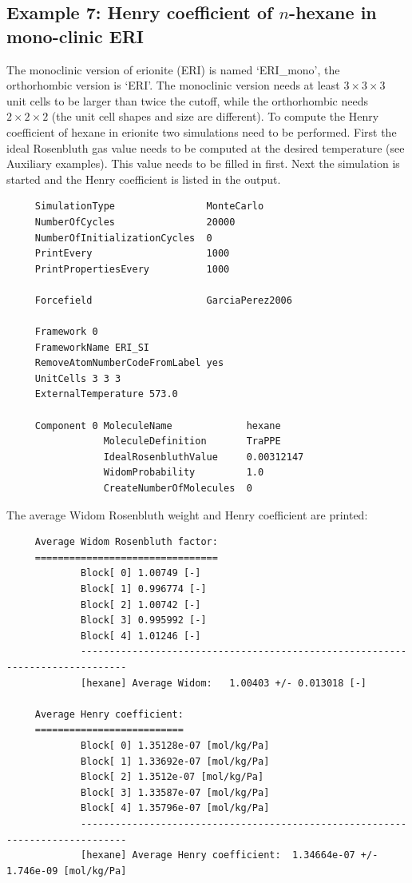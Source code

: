 \subsection*{Example 7: Henry coefficient of $n$-hexane in mono-clinic ERI}
The monoclinic version of erionite (ERI) is named `ERI\_mono', the orthorhombic version is `ERI'.
The monoclinic version needs at least $3\times3\times3$ unit cells to be larger than twice the cutoff,
while the orthorhombic needs $2\times2\times2$ (the unit cell shapes and size are different).
To compute the Henry coefficient of hexane in erionite two simulations need to be performed. First
the ideal Rosenbluth gas value needs to be computed at the desired temperature (see Auxiliary examples).
This value needs to be filled in first. Next the simulation is started and the Henry coefficient is
listed in the output.
\begin{tiny}
\begin{verbatim}
     SimulationType                MonteCarlo
     NumberOfCycles                20000
     NumberOfInitializationCycles  0
     PrintEvery                    1000
     PrintPropertiesEvery          1000
     
     Forcefield                    GarciaPerez2006
     
     Framework 0
     FrameworkName ERI_SI
     RemoveAtomNumberCodeFromLabel yes
     UnitCells 3 3 3
     ExternalTemperature 573.0
     
     Component 0 MoleculeName             hexane
                 MoleculeDefinition       TraPPE
                 IdealRosenbluthValue     0.00312147
                 WidomProbability         1.0
                 CreateNumberOfMolecules  0
\end{verbatim}
\end{tiny}

The average Widom Rosenbluth weight and Henry coefficient are printed:
\begin{tiny}
\begin{verbatim}
     Average Widom Rosenbluth factor:
     ================================
             Block[ 0] 1.00749 [-]
             Block[ 1] 0.996774 [-]
             Block[ 2] 1.00742 [-]
             Block[ 3] 0.995992 [-]
             Block[ 4] 1.01246 [-]
             ------------------------------------------------------------------------------
             [hexane] Average Widom:   1.00403 +/- 0.013018 [-]

     Average Henry coefficient:
     ==========================
             Block[ 0] 1.35128e-07 [mol/kg/Pa]
             Block[ 1] 1.33692e-07 [mol/kg/Pa]
             Block[ 2] 1.3512e-07 [mol/kg/Pa]
             Block[ 3] 1.33587e-07 [mol/kg/Pa]
             Block[ 4] 1.35796e-07 [mol/kg/Pa]
             ------------------------------------------------------------------------------
             [hexane] Average Henry coefficient:  1.34664e-07 +/- 1.746e-09 [mol/kg/Pa]
\end{verbatim}
\end{tiny}
